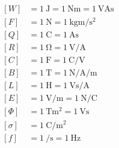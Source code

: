 
\begin{align}
\label{eq:einheit:energie}
\left[W\right] &= \SI{1}{\joule} = \SI{1}{\newton\meter} =
\SI{1}{\volt\ampere\second}\\
\label{eq:einheit:kraft}
\left[F\right] &= \SI{1}{\newton} = \SI{1}{\kilogram\meter\per\second\squared}\\
\label{eq:einheit:ladung}
\left[Q\right] &= \SI{1}{\coulomb} = \SI{1}{\ampere\second}\\
\label{eq:einheit:widerstand}
\left[R\right] &= \SI{1}{\ohm} = \SI{1}{\volt\per\ampere}\\
\label{eq:einheit:kapazitaet}
\left[C\right] &= \SI{1}{\farad} =
\SI{1}{\coulomb\per\volt}\\
\label{eq:einheit:magnetische:flussdichte}
\left[B\right] &= \SI{1}{\tesla} = \SI{1}{\newton\per\ampere\per\meter}\\
\label{eq:einheit:induktivitaet}
\left[L\right] &= \SI{1}{\henry} = \SI{1}{\volt\second\per\ampere}\\
\label{eq:einheit:elektrisches:feld}
\left[E\right] &= \SI{1}{\volt\per\meter} = \SI{1}{\newton\per\coulomb}\\
\label{eq:einheit:magnetischer:fluss}
\left[\Phi\right] &= \SI{1}{\tesla\meter\squared} = \SI{1}{\volt\second}\\
\label{eq:einheit:elektrische:flussdichte}
\left[\sigma\right] &= \SI{1}{\coulomb\per\meter\squared}\\
\label{eq:einheit:frequenz}
\left[f\right] &= \SI{1}{\per\second} = \SI{1}{\hertz}
\end{align}